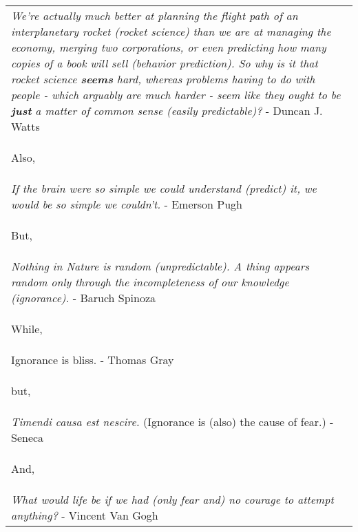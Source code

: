 \documentclass[PhD]{iiitd}
\begin{document}
\begin{table}[!th]
    \centering
    \begin{tabularx}{1\textwidth}{X}
        
        \textit{We're actually much better at planning the flight path of an interplanetary rocket (rocket science) than we are at managing the economy, merging two corporations, or even predicting how many copies of a book will sell (behavior prediction). So why is it that rocket science \textbf{seems} hard, whereas problems having to do with people - which arguably are much harder - seem like they ought to be \textbf{just} a matter of common sense (easily predictable)?} - Duncan J. Watts\\

        \begin{center}
                Also,
        \end{center}\\


        \textit{If the brain were so simple we could understand (predict) it, we would be so simple we couldn't.} - Emerson Pugh\\
        
        
        
        \begin{center}
            But,
        \end{center}\\
        
        \textit{Nothing in Nature is random (unpredictable). A thing appears random only through the incompleteness of our knowledge (ignorance).} - Baruch Spinoza\\

        \begin{center}
                While,
        \end{center}\\
        

        Ignorance is bliss. - Thomas Gray\\
        
        \begin{center}
                but,
        \end{center}\\

        \textit{Timendi causa est nescire.} (Ignorance is (also) the cause of fear.) - Seneca\\

        \begin{center}
                And,
        \end{center}\\
        
        \textit{What would life be if we had (only fear and) no courage to attempt anything?} - Vincent Van Gogh\\
        
    \end{tabularx}
    
\end{table}
\end{document}
